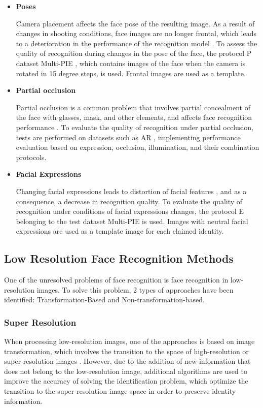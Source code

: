 \documentclass[11pt,a4paper]{article}
\begin{document}
\begin{itemize}
\item{\bf{Poses}}

Camera placement affects the face pose of the resulting image. As a result of changes in shooting conditions, face images are no longer frontal, which leads to a deterioration in the performance of the recognition model \cite{4}. To assess the quality of recognition during changes in the pose of the face, the protocol P dataset Multi-PIE \cite{5}, which contains images of the face when the camera is rotated in 15 degree steps, is used. Frontal images are used as a template. 

\item{\bf{Partial occlusion}}

Partial occlusion is a common problem that involves partial concealment of the face with glasses, mask, and other elements, and affects face recognition performance \cite{6}. To evaluate the quality of recognition under partial occlusion, tests are performed on datasets such as AR \cite{7}, implementing performance evaluation based on expression, occlusion, illumination, and their combination protocols.  				
						
\item{\bf{Facial Expressions}}

Changing facial expressions leads to distortion of facial features \cite{8}, and as a consequence, a decrease in recognition quality. To evaluate the quality of recognition under conditions of facial expressions changes, the protocol E belonging to the test dataset Multi-PIE \cite{5} is used. Images with neutral facial expressions are used as a template image for each claimed identity.
\end{itemize}

\subsection{Low Resolution Face Recognition Methods}
One of the unresolved problems \cite{8} of face recognition is face recognition in low-resolution images. To solve this problem, 2 types of approaches have been identified: Transformation-Based and Non-transformation-based.

\subsubsection{Super Resolution}
When processing low-resolution images, one of the approaches is based on image transformation, which involves the transition to the space of high-resolution or super-resolution images \cite{9}. However, due to the addition of new information that does not belong to the low-resolution image, additional algorithms \cite{10, 11} are used to improve the accuracy of solving the identification problem, which optimize the transition to the super-resolution image space in order to preserve identity information. 
\end{document}
